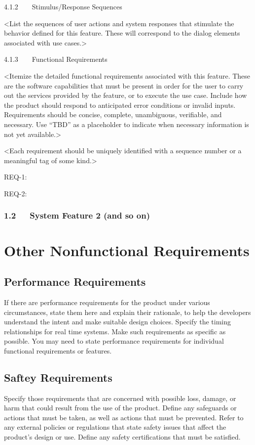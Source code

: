 \documentclass{scrreprt}
\begin{document}
4.1.2    Stimulus/Response Sequences

<List the sequences of user actions and system responses that stimulate the behavior defined for this feature. These will correspond to the dialog elements associated with use cases.>

4.1.3    Functional Requirements

<Itemize the detailed functional requirements associated with this feature. These are the software capabilities that must be present in order for the user to carry out the services provided by the feature, or to execute the use case. Include how the product should respond to anticipated error conditions or invalid inputs. Requirements should be concise, complete, unambiguous, verifiable, and necessary. Use “TBD” as a placeholder to indicate when necessary information is not yet available.>

<Each requirement should be uniquely identified with a sequence number or a meaningful tag of some kind.>

REQ-1:

REQ-2:

\subsection*{1.2   System Feature 2 (and so on)}
      
    \chapter{Other Nonfunctional Requirements}
    \section{Performance Requirements} 
    If there are performance requirements for the product under various circumstances, state them here and explain their rationale, to help the developers understand the intent and make suitable design choices. Specify the timing relationships for real time systems. Make such requirements as specific as possible. You may need to state performance requirements for individual functional requirements or features. 
    \section{Saftey Requirements}
    Specify those requirements that are concerned with possible loss, damage, or harm that could result from the use of the product. Define any safeguards or actions that must be taken, as well as actions that must be prevented. Refer to any external policies or regulations that state safety issues that affect the product’s design or use. Define any safety certifications that must be satisfied. 
\end{document}
